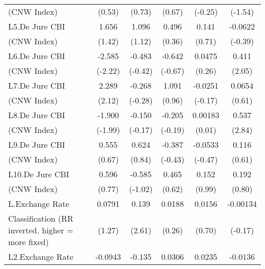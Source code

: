 {\begin{tabular}{l*{5}{c}}
(CNW Index)     &   (0.53)         &   (0.73)         &   (0.67)         &  (-0.25)         &  (-1.54)         \\
\addlinespace
L5.De Jure CBI  &    1.656         &    1.096         &    0.496         &    0.141         &  -0.0622         \\
(CNW Index)     &   (1.42)         &   (1.12)         &   (0.36)         &   (0.71)         &  (-0.39)         \\
\addlinespace
L6.De Jure CBI  &   -2.585\sym{*}  &   -0.483         &   -0.642         &   0.0475         &    0.411\sym{*}  \\
(CNW Index)     &  (-2.22)         &  (-0.42)         &  (-0.67)         &   (0.26)         &   (2.05)         \\
\addlinespace
L7.De Jure CBI  &    2.289\sym{*}  &   -0.268         &    1.091         &  -0.0251         &   0.0654         \\
(CNW Index)     &   (2.12)         &  (-0.28)         &   (0.96)         &  (-0.17)         &   (0.61)         \\
\addlinespace
L8.De Jure CBI  &   -1.900\sym{*}  &   -0.150         &   -0.205         &  0.00183         &    0.537\sym{**} \\
(CNW Index)     &  (-1.99)         &  (-0.17)         &  (-0.19)         &   (0.01)         &   (2.84)         \\
\addlinespace
L9.De Jure CBI  &    0.555         &    0.624         &   -0.387         &  -0.0533         &    0.116         \\
(CNW Index)     &   (0.67)         &   (0.84)         &  (-0.43)         &  (-0.47)         &   (0.61)         \\
\addlinespace
L10.De Jure CBI &    0.596         &   -0.585         &    0.465         &    0.152         &    0.192         \\
(CNW Index)     &   (0.77)         &  (-1.02)         &   (0.62)         &   (0.99)         &   (0.80)         \\
\addlinespace
L.Exchange Rate &   0.0791         &    0.139\sym{*}  &   0.0188         &   0.0156         & -0.00134         \\
Classification (RR inverted, higher = more fixed)&   (1.27)         &   (2.61)         &   (0.26)         &   (0.70)         &  (-0.17)         \\
\addlinespace
L2.Exchange Rate&  -0.0943         &   -0.135\sym{**} &   0.0306         &   0.0235         &  -0.0136         \\

\end{tabular}}
